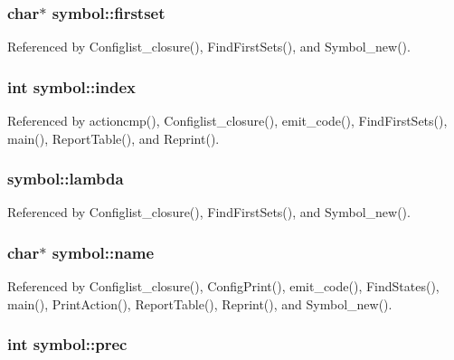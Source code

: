 \hypertarget{structsymbol_a3a267e61976991b0371b307ac4110b26}{
\subsubsection[{firstset}]{\setlength{\rightskip}{0pt plus 5cm}char$\ast$ symbol\-::firstset}}\label{structsymbol_a3a267e61976991b0371b307ac4110b26}


Referenced by Configlist\-\_\-closure(), Find\-First\-Sets(), and Symbol\-\_\-new().

\hypertarget{structsymbol_a1aa96687297a13a207e48b4d8f3ba78b}{
\subsubsection[{index}]{\setlength{\rightskip}{0pt plus 5cm}int symbol\-::index}}\label{structsymbol_a1aa96687297a13a207e48b4d8f3ba78b}


Referenced by actioncmp(), Configlist\-\_\-closure(), emit\-\_\-code(), Find\-First\-Sets(), main(), Report\-Table(), and Reprint().

\hypertarget{structsymbol_af12ee4e73e9878f1e5243ad1d1d06987}{
\subsubsection[{lambda}]{ symbol\-::lambda}}\label{structsymbol_af12ee4e73e9878f1e5243ad1d1d06987}


Referenced by Configlist\-\_\-closure(), Find\-First\-Sets(), and Symbol\-\_\-new().

\hypertarget{structsymbol_a4fad8f11a2b2d8a21dcb4f5623d6c0fd}{
\subsubsection[{name}]{\setlength{\rightskip}{0pt plus 5cm}char$\ast$ symbol\-::name}}\label{structsymbol_a4fad8f11a2b2d8a21dcb4f5623d6c0fd}


Referenced by Configlist\-\_\-closure(), Config\-Print(), emit\-\_\-code(), Find\-States(), main(), Print\-Action(), Report\-Table(), Reprint(), and Symbol\-\_\-new().

\hypertarget{structsymbol_a4058876fd1fcbafa71c0e52c518551ee}{
\subsubsection[{prec}]{\setlength{\rightskip}{0pt plus 5cm}int symbol\-::prec}}\label{structsymbol_a4058876fd1fcbafa71c0e52c518551ee}


